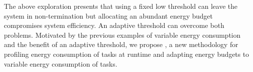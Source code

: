 The above exploration presents that using a fixed low threshold can leave the system in non-termination but allocating an abundant energy budget compromises system efficiency. 
An adaptive threshold can overcome both problems.
Motivated by the previous examples of variable energy consumption and the benefit of an adaptive threshold, we propose \nn{}, a new methodology for profiling energy consumption of tasks at runtime and adapting energy budgets to variable energy consumption of tasks. 